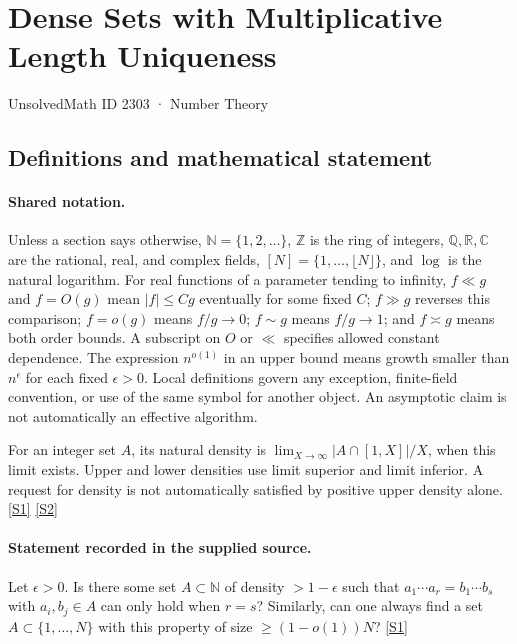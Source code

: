 \documentclass[11pt,a4paper]{article}
\newcommand{\N}{\mathbb{N}}
\newcommand{\Z}{\mathbb{Z}}
\newcommand{\Q}{\mathbb{Q}}
\newcommand{\R}{\mathbb{R}}
\newcommand{\C}{\mathbb{C}}
\newcommand{\sref}[2]{\hyperlink{source:#1:#2}{[S#2]}}
\begin{document}

\setcounter{section}{2302}

\section{Dense Sets with Multiplicative Length Uniqueness}\label{2303}

{\small\sffamily UnsolvedMath ID 2303 · Number Theory}

\subsection{Definitions and mathematical statement}

\paragraph{Shared notation.}Unless a section says otherwise, $\N=\{1,2,\ldots\}$,
$\Z$ is the ring of integers, $\Q,\R,\C$ are the rational, real, and complex
fields, $[N]=\{1,\ldots,\lfloor N\rfloor\}$, and $\log$ is the natural
logarithm. For real functions of a parameter tending to infinity,
$f\ll g$ and $f=O(g)$ mean $|f|\leq Cg$ eventually for some fixed $C$;
$f\gg g$ reverses this comparison; $f=o(g)$ means $f/g\to0$;
$f\sim g$ means $f/g\to1$; and $f\asymp g$ means both order bounds.
A subscript on $O$ or $\ll$ specifies allowed constant dependence.
The expression $n^{o(1)}$ in an upper bound means growth smaller than
$n^\epsilon$ for each fixed $\epsilon>0$. Local definitions govern any
exception, finite-field convention, or use of the same symbol for another
object. An asymptotic claim is not automatically an effective algorithm.



For an integer set $A$, its natural density is $\lim_{X\to\infty}|A\cap[1,X]|/X$, when this limit exists. Upper and lower densities use limit superior and limit inferior. A request for density is not automatically satisfied by positive upper density alone. \sref{2303}{1} \sref{2303}{2}

\paragraph{Statement recorded in the supplied source.}
Let $\epsilon>0$. Is there some set $A\subset \mathbb{N}$ of density $>1-\epsilon$ such that $a_1\cdots a_r=b_1\cdots b_s$ with $a_i,b_j\in A$ can only hold when $r=s$?
Similarly, can one always find a set $A\subset\{1,\ldots,N\}$ with this property of size $\geq (1-o(1))N$? \sref{2303}{1}
\end{document}

